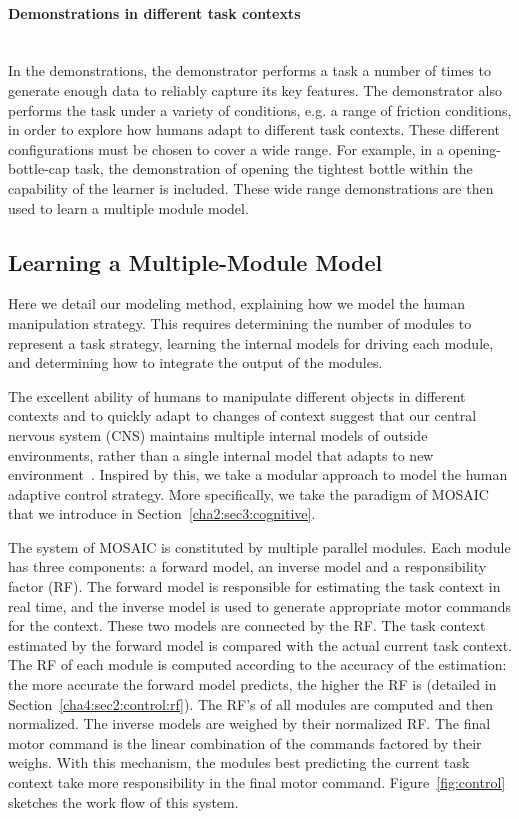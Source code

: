 \paragraph{Demonstrations in different task contexts}  ~\\
In the demonstrations, the demonstrator performs a task a number of
times to generate enough data to reliably capture its key features.
The demonstrator also performs the task under a variety of conditions, e.g. a range of friction conditions, in order to explore how humans adapt to different task contexts. These different configurations must be chosen to cover a wide range.
For example, in a opening-bottle-cap task, the demonstration of opening
the tightest bottle within the capability of the learner is
included. These wide range demonstrations are then used to learn a
multiple module model.

\subsection{Learning a Multiple-Module Model}
\label{cha4:sec2:learn}
Here we detail our modeling method, explaining how we model the human manipulation strategy.  This requires determining the number of modules to represent a task strategy, learning the internal models for driving each
module, and determining how to integrate the output of the modules.

The excellent ability of humans to manipulate different objects in different contexts and to quickly adapt to changes of context suggest that our central nervous system (CNS) maintains multiple internal models of outside environments, rather than a single internal model that adapts to new environment~\cite{neilson1985acquisition}. 
Inspired by this, we take a modular approach to model the human adaptive control strategy. More specifically, we take the paradigm of MOSAIC~\cite{haruno2001mosaic} that we introduce in Section~\ref{cha2:sec3:cognitive}.

The system of MOSAIC is constituted by multiple parallel modules. Each module has three components: a forward model, an inverse model and a responsibility factor (RF). The forward model is responsible for estimating the task context in real time, and the inverse model is used to generate appropriate motor commands for the context. These two models are connected by the RF. The task context estimated by the forward model is compared with the actual current task context.
The RF of each module is computed according to the accuracy of the estimation: the more accurate the forward model predicts, the higher the RF is (detailed in Section~\ref{cha4:sec2:control:rf}). The RF's of all modules are computed and then normalized.
The inverse models are weighed by their normalized RF. The final motor command is the linear combination of the commands factored by their weighs. With this mechanism, the modules best predicting the current task context take more responsibility in the final motor command. Figure~\ref{fig:control} sketches the work flow of this system. %

